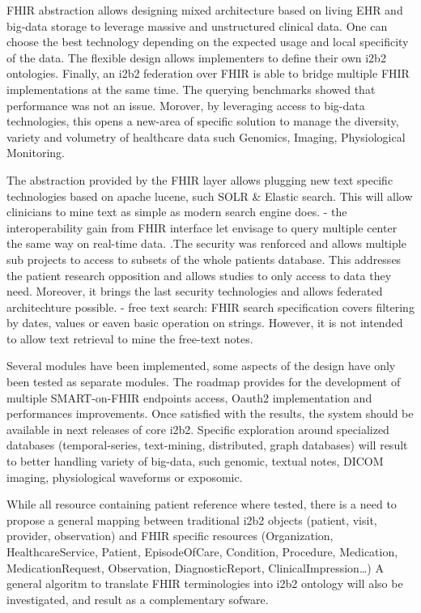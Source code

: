 \documentclass{amia}
\begin{document}
FHIR abstraction allows designing mixed architecture based on living EHR and big-data storage to leverage massive and unstructured clinical data. One can choose the best technology depending on the expected usage and local specificity of the data. The flexible design allows implementers to define their own i2b2 ontologies. Finally, an i2b2 federation over FHIR is able to bridge multiple FHIR implementations at the same time. The querying benchmarks showed that performance was not an issue. Morover, by leveraging access to big-data technologies, this opens a new-area of specific solution to manage the diversity, variety and volumetry of healthcare data such Genomics, Imaging, Physiological Monitoring.

The abstraction provided by the FHIR layer allows plugging new text specific technologies based on apache lucene, such SOLR \& Elastic search. This will allow clinicians to mine text as simple as modern search engine does. - the interoperability gain from FHIR interface let envisage to query multiple center the same way on real-time data.
.The security was renforced and allows multiple sub projects to access to subsets of the whole patients database. This addresses the patient research opposition and allows studies to only access to data they need. Moreover, it brings the last security technologies and allows federated architechture possible. - free text search: FHIR search specification covers filtering by dates, values or eaven basic operation on strings. However, it is not intended to allow text retrieval to mine the free-text notes. 

Several modules have been implemented, some aspects of the design have only been tested as separate modules.
The roadmap provides for the development of multiple SMART-on-FHIR endpoints access, Oauth2 implementation and performances improvements. Once satisfied with the results, the system should be available in next releases of core i2b2. Specific exploration around specialized databases (temporal-series, text-mining, distributed, graph databases) will result to better handling variety of big-data, such genomic\cite{ref18}, textual notes, DICOM imaging, physiological waveforms or exposomic.

While all resource containing patient reference where tested, there is a need to propose a general mapping between traditional i2b2 objects (patient, visit, provider, observation) and FHIR specific resources (Organization, HealthcareService, Patient, EpisodeOfCare, Condition, Procedure, Medication, MedicationRequest, Observation, DiagnosticReport, ClinicalImpression\ldots)
A general algoritm to translate FHIR terminologies into i2b2 ontology will also be investigated, and result as a complementary sofware.
\end{document}
